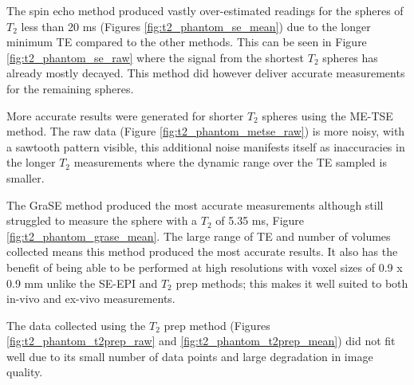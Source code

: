 The spin echo method produced vastly over-estimated readings for the spheres of $T_2$ less than 20 ms (Figures \ref{fig:t2_phantom_se_mean}) due to the longer minimum \ac{TE} compared to the other methods. This can be seen in Figure \ref{fig:t2_phantom_se_raw} where the signal from the shortest $T_2$ spheres has already mostly decayed. This method did however deliver accurate measurements for the remaining spheres.

More accurate results were generated for shorter $T_2$ spheres using the \ac{ME-TSE} method. The raw data (Figure \ref{fig:t2_phantom_metse_raw}) is more noisy, with a sawtooth pattern visible, this additional noise manifests itself as inaccuracies in the longer $T_2$ measurements where the dynamic range over the \ac{TE} sampled is smaller.

The \ac{GraSE} method produced the most accurate measurements although still struggled to measure the sphere with a $T_2$ of 5.35 ms, Figure \ref{fig:t2_phantom_grase_mean}. The large range of \ac{TE} and number of volumes collected means this method produced the most accurate results. It also has the benefit of being able to be performed at high resolutions with voxel sizes of 0.9 x 0.9 mm unlike the \ac{SE}-\ac{EPI} and $T_2$ prep methods; this makes it well suited to both in-vivo and ex-vivo measurements.

The data collected using the $T_2$ prep method (Figures \ref{fig:t2_phantom_t2prep_raw} and \ref{fig:t2_phantom_t2prep_mean}) did not fit well due to its small number of data points and large degradation in image quality.

